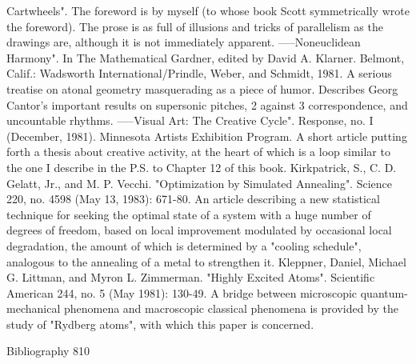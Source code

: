   Cartwheels". The foreword is by myself (to whose book Scott symmetrically wrote the
  foreword). The prose is as full of illusions and tricks of parallelism as the drawings are,
  although it is not immediately apparent.
-----Noneuclidean Harmony". In The Mathematical Gardner, edited by David A. Klarner.
  Belmont, Calif.: Wadsworth International/Prindle, Weber, and Schmidt, 1981. A serious
  treatise on atonal geometry masquerading as a piece of humor. Describes Georg Cantor's
  important results on supersonic pitches, 2 against 3 correspondence, and uncountable
  rhythms.
-----Visual Art: The Creative Cycle". Response, no. I (December, 1981). Minnesota Artists
  Exhibition Program. A short article putting forth a thesis about creative activity, at the heart
  of which is a loop similar to the one I describe in the P.S. to Chapter 12 of this book.
Kirkpatrick, S., C. D. Gelatt, Jr., and M. P. Vecchi. "Optimization by Simulated Annealing".
  Science 220, no. 4598 (May 13, 1983): 671-80. An article describing a new statistical
  technique for seeking the optimal state of a system with a huge number of degrees of
  freedom, based on local improvement modulated by occasional local degradation, the
  amount of which is determined by a "cooling schedule", analogous to the annealing of a
  metal to strengthen it.
Kleppner, Daniel, Michael G. Littman, and Myron L. Zimmerman. "Highly Excited Atoms".
  Scientific American 244, no. 5 (May 1981): 130-49. A bridge between microscopic
  quantum-mechanical phenomena and macroscopic classical phenomena is provided by the
  study of "Rydberg atoms", with which this paper is concerned.

Bibliography                                                                                    810

